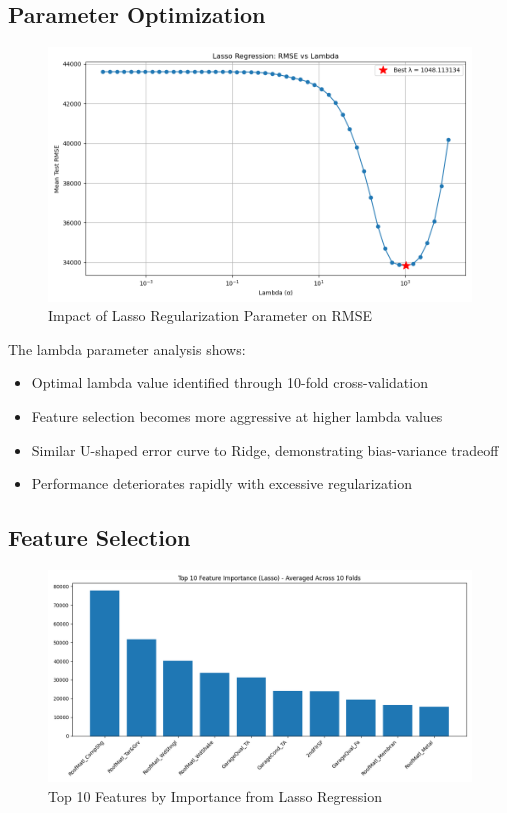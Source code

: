\subsection{Parameter Optimization}
\begin{figure}[H]
    \centering
    \includegraphics[width=1.0\textwidth]{figures/lasso_lambda_vs_rmse.png}
    \caption{Impact of Lasso Regularization Parameter on RMSE}
    \label{fig:lasso_lambda}
\end{figure}

The lambda parameter analysis shows:
\begin{itemize}
    \item Optimal lambda value identified through 10-fold cross-validation
    \item Feature selection becomes more aggressive at higher lambda values
    \item Similar U-shaped error curve to Ridge, demonstrating bias-variance tradeoff
    \item Performance deteriorates rapidly with excessive regularization
\end{itemize}

\subsection{Feature Selection}
\begin{figure}[H]
    \centering
    \includegraphics[width=1.0\textwidth]{figures/lasso_feature_importance.png}
    \caption{Top 10 Features by Importance from Lasso Regression}
    \label{fig:lasso_importance}
\end{figure}

